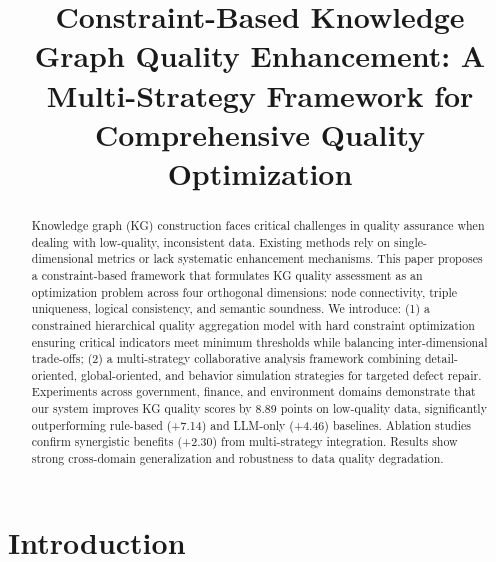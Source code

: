 \documentclass[runningheads]{llncs}
\begin{document}
\title{Constraint-Based Knowledge Graph Quality Enhancement: A Multi-Strategy Framework for Comprehensive Quality Optimization}


\author{ \and
{}}


\institute{
\email{} \and
\\
\email{}}

\maketitle

\begin{abstract}
Knowledge graph (KG) construction faces critical challenges in quality assurance when dealing with low-quality, inconsistent data. Existing methods rely on single-dimensional metrics or lack systematic enhancement mechanisms. This paper proposes a constraint-based framework that formulates KG quality assessment as an optimization problem across four orthogonal dimensions: node connectivity, triple uniqueness, logical consistency, and semantic soundness. We introduce: (1) a constrained hierarchical quality aggregation model with hard constraint optimization ensuring critical indicators meet minimum thresholds while balancing inter-dimensional trade-offs; (2) a multi-strategy collaborative analysis framework combining detail-oriented, global-oriented, and behavior simulation strategies for targeted defect repair. Experiments across government, finance, and environment domains demonstrate that our system improves KG quality scores by 8.89 points on low-quality data, significantly outperforming rule-based (+7.14) and LLM-only (+4.46) baselines. Ablation studies confirm synergistic benefits (+2.30) from multi-strategy integration. Results show strong cross-domain generalization and robustness to data quality degradation.

\end{abstract}

\section{Introduction}
\end{document}
